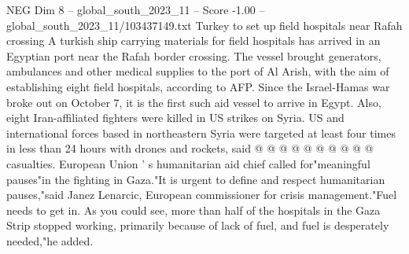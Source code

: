 \begin{textsample}{NEG Dim 8 – global\_south\_2023\_11 – Score -1.00 – global\_south\_2023\_11/103437149.txt}
Turkey to set up field hospitals near Rafah crossing A turkish ship carrying materials for field hospitals has arrived in an Egyptian port near the Rafah border crossing.
The vessel brought generators, ambulances and other medical supplies to the port of Al Arish, with the aim of establishing eight field hospitals, according to AFP.
Since the Israel-Hamas war broke out on October 7, it is the first such aid vessel to arrive in Egypt.
Also, eight Iran-affiliated fighters were killed in US strikes on Syria.
US and international forces based in northeastern Syria were targeted at least four times in less than 24 hours with drones and rockets, said @ @ @ @ @ @ @ @ @ @ casualties.
European Union ' s humanitarian aid chief called for"meaningful pauses"in the fighting in Gaza."It is urgent to define and respect humanitarian pauses,"said Janez Lenarcic, European commissioner for crisis management."Fuel needs to get in.
As you could see, more than half of the hospitals in the Gaza Strip stopped working, primarily because of lack of fuel, and fuel is desperately needed,"he added.

\end{textsample}
